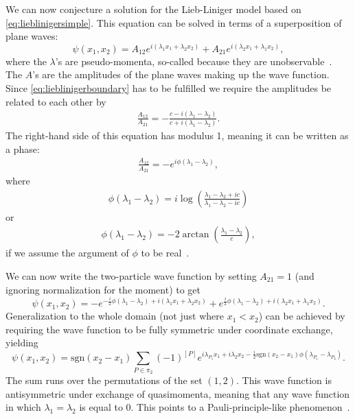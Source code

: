 \documentclass[11pt, a4paper]{report} %
\begin{document}
We can now conjecture a solution for the Lieb-Liniger model based on \cref{eq:lieblinigersimple}.
This equation can be solved in terms of a superposition of plane waves:
\begin{equation}
	\psi(x_1,x_2) = A_{12} e^{i(\lambda_1x_1 + \lambda_2 x_2)} + A_{21} e^{i(\lambda_2 x_1 + \lambda_1 x_2)},
\end{equation}
where the \(\lambda\)'s are pseudo-momenta, so-called because they are unobservable~\cite{Franchini2017}.
The \(A\)'s are the amplitudes of the plane waves making up the wave function.
Since \cref{eq:lieblinigerboundary} has to be fulfilled we require the amplitudes be related to each other by
\begin{align}
	\frac{A_{12}}{A_{21}} = -\frac{c-i(\lambda_1 - \lambda_2) }{c+i(\lambda_1 - \lambda_2)}.
\end{align}
The right-hand side of this equation has modulus 1, meaning it can be written as a phase:
\begin{align}
	\frac{A_{12}}{A_{21}} = -e^{i\phi(\lambda_1-\lambda_2)},
\end{align}
where~\cite{Korepin1993}
\begin{align}
  \phi(\lambda_1-\lambda_2) = i \log(\frac{\lambda_1-\lambda_2 + ic}{\lambda_1-\lambda_2-ic})
\end{align}
or
\begin{align}
	\phi(\lambda_1-\lambda_2) = -2\arctan\left(\frac{\lambda_1-\lambda_2}{c}\right),
\end{align}
if we assume the argument of \(\phi\) to be real~\cite{Lieb1963}.

We can now write the two-particle wave function by setting \(A_{21}=1\) (and ignoring normalization for the moment) to get
\begin{equation}
	\psi(x_1,x_2) = - e^{-\frac{i}{2}\phi(\lambda_1-\lambda_2)+i(\lambda_1x_1 + \lambda_2 x_2)} + e^{\frac{i}{2}\phi(\lambda_1-\lambda_2)+i(\lambda_2 x_1 + \lambda_1 x_2)}.
\end{equation}
Generalization to the whole domain (not just where \(x_1 < x_2\)) can be achieved by requiring the wave function to be fully symmetric under coordinate exchange,
yielding
\begin{equation}
  \psi(x_1,x_2) = \textrm{sgn}(x_2-x_1)\sum_{P\in\pi_2} (-1)^{[P]} e^{i\lambda_{P_1}x_1 + i \lambda_2 x_2- \frac{i}{2} \textrm{sgn}(x_2-x_1)\phi(\lambda_{P_1}-\lambda_{P_2})}.
\end{equation}
The sum runs over the permutations of the set \((1,2)\).
This wave function is antisymmetric under exchange of quasimomenta, meaning that any wave function in which \(\lambda_1=\lambda_2\) is equal to 0.
This points to a Pauli-principle-like phenomenon~\cite{Caux2009,Franchini2017}.
\end{document}
